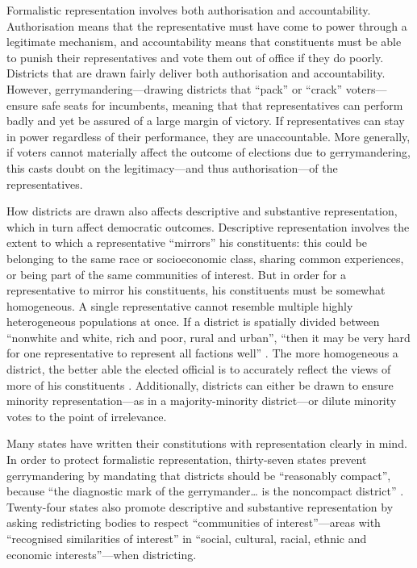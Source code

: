 \documentclass[]{article}
\begin{document}
Formalistic representation involves both authorisation and
accountability. Authorisation means that the representative must have
come to power through a legitimate mechanism, and accountability means
that constituents must be able to punish their representatives and vote
them out of office if they do poorly. Districts that are drawn fairly
deliver both authorisation and accountability. However,
gerrymandering---drawing districts that ``pack'' or ``crack''
voters---ensure safe seats for incumbents, meaning that that
representatives can perform badly and yet be assured of a large margin
of victory. If representatives can stay in power regardless of their
performance, they are unaccountable. More generally, if voters cannot
materially affect the outcome of elections due to gerrymandering, this
casts doubt on the legitimacy---and thus authorisation---of the
representatives.

How districts are drawn also affects descriptive and substantive
representation, which in turn affect democratic outcomes. Descriptive
representation involves the extent to which a representative ``mirrors''
his constituents: this could be belonging to the same race or
socioeconomic class, sharing common experiences, or being part of the
same communities of interest. But in order for a representative to
mirror his constituents, his constituents must be somewhat homogeneous.
A single representative cannot resemble multiple highly heterogeneous
populations at once. If a district is spatially divided between
``nonwhite and white, rich and poor, rural and urban'', ``then it may be
very hard for one representative to represent all factions well''
\citep{cain1984}. The more homogeneous a district, the better able the
elected official is to accurately reflect the views of more of his
constituents \citep{brunell2010}. Additionally, districts can either be
drawn to ensure minority representation---as in a majority-minority
district---or dilute minority votes to the point of irrelevance.

Many states have written their constitutions with representation clearly
in mind. In order to protect formalistic representation, thirty-seven
states prevent gerrymandering by mandating that districts should be
``reasonably compact'', because ``the diagnostic mark of the
gerrymander\ldots{} is the noncompact district'' \citep{pp1991}.
Twenty-four states also promote descriptive and substantive
representation by asking redistricting bodies to respect ``communities
of interest''---areas with ``recognised similarities of interest'' in
``social, cultural, racial, ethnic and economic interests''---when
districting.
\end{document}
